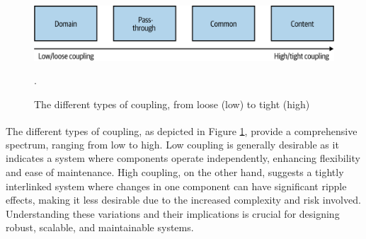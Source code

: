 \begin{figure}
    \centering
    \includegraphics[scale=0.5]{Pictures/3_types_coupling.png}
    \caption{The different types of coupling, from loose (low) to tight (high)}.
    \label{fig:3_types_coupling}
\end{figure}

The different types of coupling\textsuperscript{\cite{microservices_book}}, as depicted in Figure
\ref{fig:3_types_coupling}, provide a comprehensive spectrum, ranging from low to high. Low coupling
is generally desirable as it indicates a system where components operate independently, enhancing
flexibility and ease of maintenance. High coupling, on the other hand, suggests a tightly
interlinked system where changes in one component can have significant ripple effects, making it
less desirable due to the increased complexity and risk involved. Understanding these variations and
their implications is crucial for designing robust, scalable, and maintainable systems.

